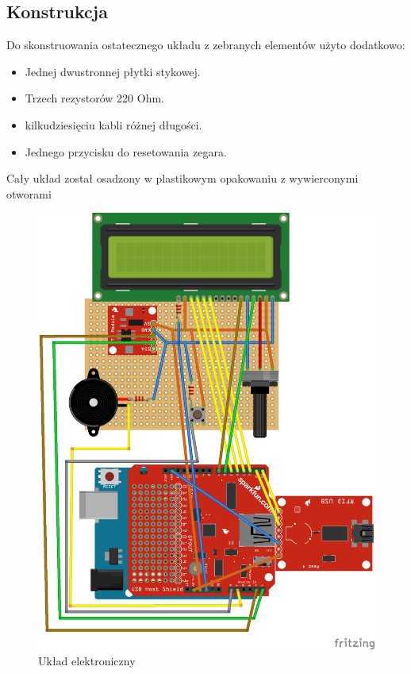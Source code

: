 \documentclass[declaration,shortabstract, mgr]{iithesis}
\begin{document}
\subsection{Konstrukcja}
\indent Do skonstruowania ostatecznego układu z zebranych elementów użyto dodatkowo:
\begin{itemize}
\item Jednej dwustronnej płytki stykowej.
\item Trzech rezystorów 220 Ohm.
\item kilkudziesięciu kabli różnej długości.
\item Jednego przycisku do resetowania zegara.
\end{itemize}
\indent Cały układ został osadzony w plastikowym opakowaniu z wywierconymi otworami\\
\begin{figure}[h]
\caption{Układ elektroniczny}
\centering
\includegraphics{circuit.png}
\end{figure}
\end{document}
